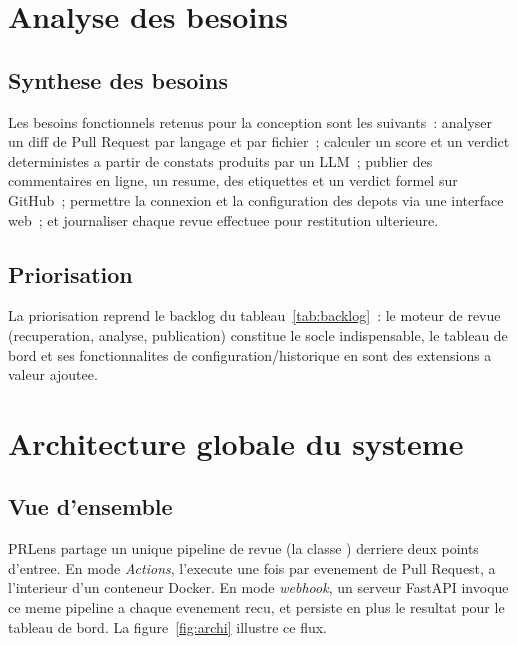 \documentclass[a4paper,12pt,oneside]{report}
\begin{document}
\section{Analyse des besoins}

\subsection{Synthese des besoins}

Les besoins fonctionnels retenus pour la conception sont les suivants~: analyser un diff de Pull Request par langage et par fichier~; calculer un score et un verdict deterministes a partir de constats produits par un LLM~; publier des commentaires en ligne, un resume, des etiquettes et un verdict formel sur GitHub~; permettre la connexion et la configuration des depots via une interface web~; et journaliser chaque revue effectuee pour restitution ulterieure.

\subsection{Priorisation}

La priorisation reprend le backlog du tableau~\ref{tab:backlog}~: le moteur de revue (recuperation, analyse, publication) constitue le socle indispensable, le tableau de bord et ses fonctionnalites de configuration/historique en sont des extensions a valeur ajoutee.

\section{Architecture globale du systeme}

\subsection{Vue d'ensemble}

PRLens partage un unique pipeline de revue (la classe ) derriere deux points d'entree. En mode \emph{Actions},  l'execute une fois par evenement de Pull Request, a l'interieur d'un conteneur Docker. En mode \emph{webhook}, un serveur FastAPI invoque ce meme pipeline a chaque evenement recu, et persiste en plus le resultat pour le tableau de bord. La figure~\ref{fig:archi} illustre ce flux.
\end{document}
